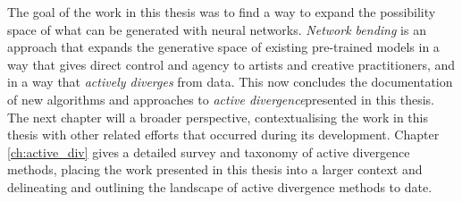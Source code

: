 The goal of the work in this thesis was to find a way to expand the possibility space of what can be generated with neural networks.
\textit{Network bending} is an approach that expands the generative space of existing pre-trained models in a way that gives direct control and agency to artists and creative practitioners, and in a way that \textit{actively diverges} from data.
This now concludes the documentation of new algorithms and approaches to \textit{active divergence}presented in this thesis. 
The next chapter will a broader perspective, contextualising the work in this thesis with other related efforts that occurred during its development.
Chapter \ref{ch:active_div} gives a detailed survey and taxonomy of active divergence methods, placing the work presented in this thesis into a larger context and delineating and outlining the landscape of active divergence methods to date. 
